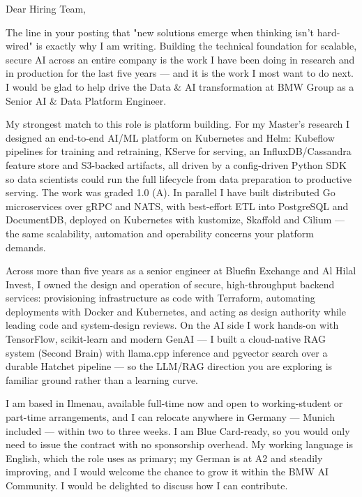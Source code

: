 \documentclass[11pt,a4paper]{coverletter}
\begin{document}

\opening{Dear Hiring Team,}

The line in your posting that "new solutions emerge when thinking isn't hard-wired" is exactly why I am writing. Building the technical foundation for scalable, secure AI across an entire company is the work I have been doing in research and in production for the last five years — and it is the work I most want to do next. I would be glad to help drive the Data \& AI transformation at BMW Group as a Senior AI \& Data Platform Engineer.

My strongest match to this role is platform building. For my Master's research I designed an end-to-end AI/ML platform on Kubernetes and Helm: Kubeflow pipelines for training and retraining, KServe for serving, an InfluxDB/Cassandra feature store and S3-backed artifacts, all driven by a config-driven Python SDK so data scientists could run the full lifecycle from data preparation to productive serving. The work was graded 1.0 (A). In parallel I have built distributed Go microservices over gRPC and NATS, with best-effort ETL into PostgreSQL and DocumentDB, deployed on Kubernetes with kustomize, Skaffold and Cilium — the same scalability, automation and operability concerns your platform demands.

Across more than five years as a senior engineer at Bluefin Exchange and Al Hilal Invest, I owned the design and operation of secure, high-throughput backend services: provisioning infrastructure as code with Terraform, automating deployments with Docker and Kubernetes, and acting as design authority while leading code and system-design reviews. On the AI side I work hands-on with TensorFlow, scikit-learn and modern GenAI — I built a cloud-native RAG system (Second Brain) with llama.cpp inference and pgvector search over a durable Hatchet pipeline — so the LLM/RAG direction you are exploring is familiar ground rather than a learning curve.

I am based in Ilmenau, available full-time now and open to working-student or part-time arrangements, and I can relocate anywhere in Germany — Munich included — within two to three weeks. I am Blue Card-ready, so you would only need to issue the contract with no sponsorship overhead. My working language is English, which the role uses as primary; my German is at A2 and steadily improving, and I would welcome the chance to grow it within the BMW AI Community. I would be delighted to discuss how I can contribute.
\end{document}
